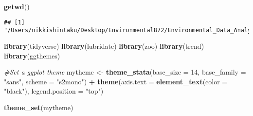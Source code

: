 \documentclass[]{article}
\newenvironment{Shaded}{\begin{snugshade}}{\end{snugshade}}
\newcommand{\CommentTok}[1]{\textcolor[rgb]{0.56,0.35,0.01}{\textit{#1}}}
\newcommand{\DataTypeTok}[1]{\textcolor[rgb]{0.13,0.29,0.53}{#1}}
\newcommand{\DecValTok}[1]{\textcolor[rgb]{0.00,0.00,0.81}{#1}}
\newcommand{\KeywordTok}[1]{\textcolor[rgb]{0.13,0.29,0.53}{\textbf{#1}}}
\newcommand{\NormalTok}[1]{#1}
\newcommand{\OperatorTok}[1]{\textcolor[rgb]{0.81,0.36,0.00}{\textbf{#1}}}
\newcommand{\StringTok}[1]{\textcolor[rgb]{0.31,0.60,0.02}{#1}}
\begin{document}
\begin{Shaded}
\begin{Highlighting}[]
\KeywordTok{getwd}\NormalTok{()}
\end{Highlighting}
\end{Shaded}

\begin{verbatim}
## [1] "/Users/nikkishintaku/Desktop/Environmental872/Environmental_Data_Analytics_2020"
\end{verbatim}

\begin{Shaded}
\begin{Highlighting}[]
\KeywordTok{library}\NormalTok{(tidyverse)}
\KeywordTok{library}\NormalTok{(lubridate)}
\KeywordTok{library}\NormalTok{(zoo)}
\KeywordTok{library}\NormalTok{(trend)}
\KeywordTok{library}\NormalTok{(ggthemes)}

\CommentTok{#Set a ggplot theme}
\NormalTok{mytheme <-}\StringTok{ }\KeywordTok{theme_stata}\NormalTok{(}\DataTypeTok{base_size =} \DecValTok{14}\NormalTok{, }\DataTypeTok{base_family =} \StringTok{"sans"}\NormalTok{, }\DataTypeTok{scheme =} \StringTok{"s2mono"}\NormalTok{) }\OperatorTok{+}
\StringTok{  }\KeywordTok{theme}\NormalTok{(}\DataTypeTok{axis.text =} \KeywordTok{element_text}\NormalTok{(}\DataTypeTok{color =} \StringTok{"black"}\NormalTok{), }
        \DataTypeTok{legend.position =} \StringTok{"top"}\NormalTok{)}

\KeywordTok{theme_set}\NormalTok{(mytheme)}


\end{Highlighting}
\end{Shaded}
\end{document}

